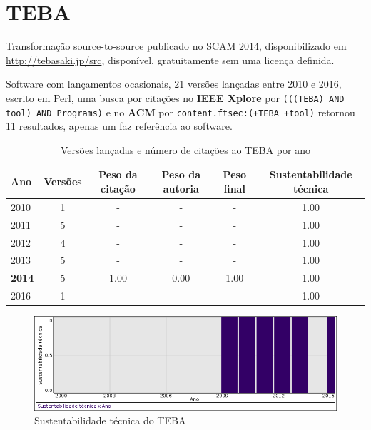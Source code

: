 \section{TEBA}

Transformação source-to-source
publicado no SCAM 2014,
disponibilizado em \url{http://tebasaki.jp/src},
disponível,
gratuitamente
sem uma licença definida.

Software com lançamentos ocasionais,
21 versões lançadas
entre 2010 e 2016,
escrito em Perl,
uma busca por citações no {\bf IEEE Xplore} por
\texttt{(((TEBA) AND tool) AND Programs)}
e no {\bf ACM} por
\texttt{content.ftsec:(+TEBA +tool)}
retornou
11 resultados,
apenas um faz referência ao software.


\begin{table}[H]
\caption{Versões lançadas e número de citações ao TEBA por ano}
\centering
\begin{tabular}{| l | c | c | c | c | c |}
  \hline
  Ano & Versões & Peso da citação & Peso da autoria & Peso final & Sustentabilidade técnica \\
  \hline
        2010 & 1 & - & - & -
        &
          {\color{blue} 1.00}
        \\
\hline
        2011 & 5 & - & - & -
        &
          {\color{blue} 1.00}
        \\
\hline
        2012 & 4 & - & - & -
        &
          {\color{blue} 1.00}
        \\
\hline
        2013 & 5 & - & - & -
        &
          {\color{blue} 1.00}
        \\
\hline
            {\bf 2014}
          &
          5
          &
          1.00
          &
          0.00
          &
          1.00
          &
            {\color{blue} 1.00}
          \\
\hline
        2016 & 1 & - & - & -
        &
          {\color{blue} 1.00}
        \\
\hline
\end{tabular}
\end{table}

\begin{figure}[h]
  \center
  \includegraphics[scale=0.50]{imagens/softwares-charts/teba.png}
  \caption{Sustentabilidade técnica do TEBA}
\end{figure}


